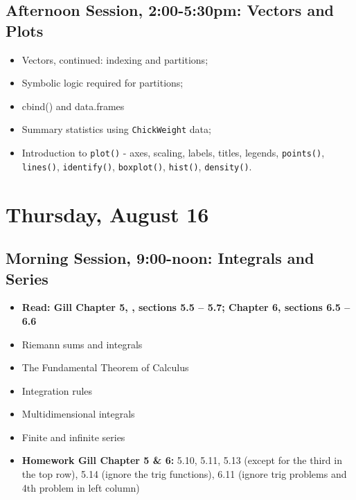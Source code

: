 \documentclass[12pt,a4paper]{article}
\begin{document}
\subsection*{Afternoon Session, 2:00-5:30pm: Vectors and Plots}
\begin{itemize}
\setlength{\itemsep}{0pt}
\footnotesize
\item Vectors, continued: indexing and partitions;
\item Symbolic logic required for partitions;
\item cbind() and data.frames
\item Summary statistics using \texttt{ChickWeight} data;
\item Introduction to \texttt{plot()} - axes, scaling, labels, titles, legends, \texttt{points()}, \texttt{lines()}, \texttt{identify()}, \texttt{boxplot()}, \texttt{hist()}, \texttt{density()}.
\end{itemize}


\section*{Thursday, August 16}

\subsection*{Morning Session, 9:00-noon: Integrals and Series}
\begin{itemize}
\setlength{\itemsep}{0pt}
\footnotesize
\item \textbf{Read: Gill Chapter 5, , sections 5.5 -- 5.7; Chapter 6, sections 6.5 -- 6.6}
\item Riemann sums and integrals
\item The Fundamental Theorem of Calculus
\item Integration rules
\item Multidimensional integrals
\item Finite and infinite series
\item \textbf{Homework Gill Chapter 5 \& 6:} 5.10, 5.11, 5.13 (except for the third in the top
row), 5.14 (ignore the trig functions), 6.11 (ignore trig problems and 4th problem in left column)

\end{itemize}
\end{document}
